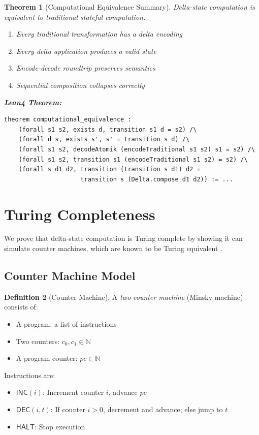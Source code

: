 \documentclass[11pt,letterpaper]{article}
\theoremstyle{plain}
\newtheorem{theorem}{Theorem}[section]
\theoremstyle{definition}
\newtheorem{definition}[theorem]{Definition}
\theoremstyle{remark}
\begin{document}
\begin{theorem}[Computational Equivalence Summary]
\label{thm:equiv-summary}
Delta-state computation is equivalent to traditional stateful computation:
\begin{enumerate}
    \item Every traditional transformation has a delta encoding
    \item Every delta application produces a valid state
    \item Encode-decode roundtrip preserves semantics
    \item Sequential composition collapses correctly
\end{enumerate}

\medskip
\noindent\textbf{Lean4 Theorem:}
\begin{lstlisting}
theorem computational_equivalence :
    (forall s1 s2, exists d, transition s1 d = s2) /\
    (forall d s, exists s', s' = transition s d) /\
    (forall s1 s2, decodeAtomik (encodeTraditional s1 s2) s1 = s2) /\
    (forall s1 s2, transition s1 (encodeTraditional s1 s2) = s2) /\
    (forall s d1 d2, transition (transition s d1) d2 = 
                     transition s (Delta.compose d1 d2)) := ...
\end{lstlisting}
\end{theorem}

\section{Turing Completeness}
\label{sec:turing}

We prove that delta-state computation is Turing complete by showing it can simulate counter machines, which are known to be Turing equivalent \cite{minsky1967computation}.

\subsection{Counter Machine Model}

\begin{definition}[Counter Machine]
\label{def:cm}
A \emph{two-counter machine} (Minsky machine) consists of:
\begin{itemize}
    \item A program: a list of instructions
    \item Two counters: $c_0, c_1 \in \mathbb{N}$
    \item A program counter: $\mathit{pc} \in \mathbb{N}$
\end{itemize}

Instructions are:
\begin{itemize}
    \item $\mathsf{INC}(i)$: Increment counter $i$, advance $\mathit{pc}$
    \item $\mathsf{DEC}(i, t)$: If counter $i > 0$, decrement and advance; else jump to $t$
    \item $\mathsf{HALT}$: Stop execution
\end{itemize}
\end{definition}
\end{document}
